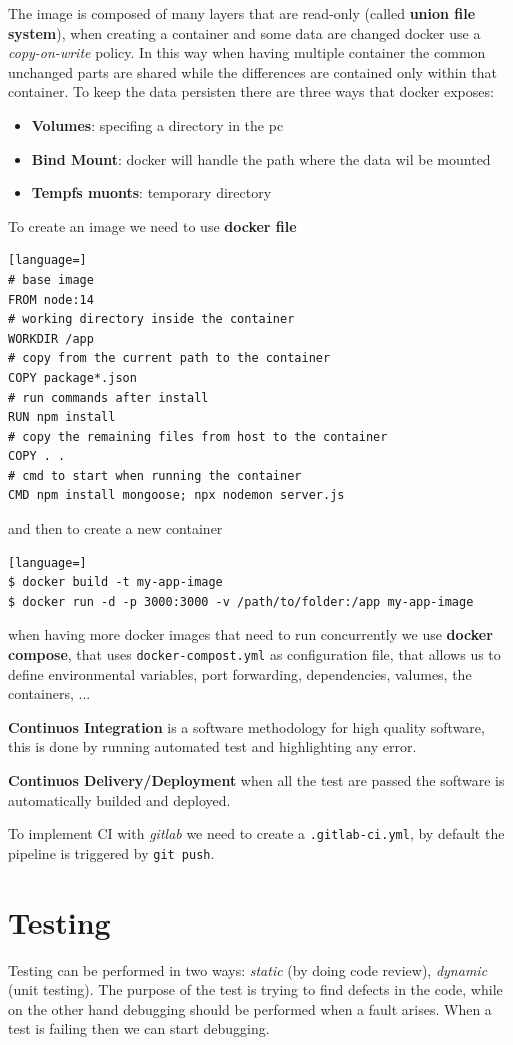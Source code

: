 \documentclass[12pt]{article}
\begin{document}
The image is composed of many layers that are read-only (called \textbf{union file system}), when creating a container and some data are changed docker use a \emph{copy-on-write} policy. In this way when having multiple container the common unchanged parts are shared while the differences are contained only within that container. To keep the data persisten there are three ways that docker exposes:
\begin{itemize}
  \item \textbf{Volumes}: specifing a directory in the pc
  \item \textbf{Bind Mount}: docker will handle the path where the data wil be mounted
  \item \textbf{Tempfs muonts}: temporary directory
\end{itemize}
To create an image we need to use \textbf{docker file}
\begin{lstlisting}[language=]
# base image
FROM node:14
# working directory inside the container
WORKDIR /app
# copy from the current path to the container
COPY package*.json
# run commands after install
RUN npm install
# copy the remaining files from host to the container
COPY . .
# cmd to start when running the container
CMD npm install mongoose; npx nodemon server.js
\end{lstlisting}
and then to create a new container
\begin{lstlisting}[language=]
$ docker build -t my-app-image
$ docker run -d -p 3000:3000 -v /path/to/folder:/app my-app-image
\end{lstlisting}
when having more docker images that need to run concurrently we use \textbf{docker compose}, that uses \texttt{docker-compost.yml} as configuration file, that allows us to define environmental variables, port forwarding, dependencies, valumes, the containers, ...

\textbf{Continuos Integration} is a software methodology for high quality software, this is done by running automated test and highlighting any error.

\textbf{Continuos Delivery/Deployment} when all the test are passed the software is automatically builded and deployed.

To implement CI with \emph{gitlab} we need to create a \texttt{.gitlab-ci.yml}, by default the pipeline is triggered by \texttt{git push}.




\newpage
\section{Testing}
Testing can be performed in two ways: \emph{static} (by doing code review), \emph{dynamic} (unit testing). The purpose of the test is trying to find defects in the code, while on the other hand debugging should be performed when a fault arises. When a test is failing then we can start debugging.
\end{document}
